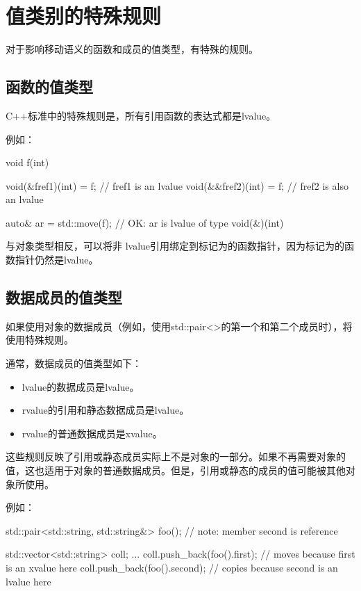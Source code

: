 \section{值类别的特殊规则}
对于影响移动语义的函数和成员的值类型，有特殊的规则。

\subsection{函数的值类型}

C++标准中的特殊规则是，所有引用函数的表达式都是lvalue。

例如：

\begin{cppcode}
void f(int) {
}

void(&fref1)(int) = f; // fref1 is an lvalue
void(&&fref2)(int) = f; // fref2 is also an lvalue

auto& ar = std::move(f); // OK: ar is lvalue of type void(&)(int)
\end{cppcode}

与对象类型相反，可以将非 lvalue引用绑定到标记为的函数指针，因为标记为的函数指针仍然是lvalue。

\subsection{数据成员的值类型}

如果使用对象的数据成员（例如，使用std::pair<>的第一个和第二个成员时），将使用特殊规则。

通常，数据成员的值类型如下：

\begin{itemize}
	\item lvalue的数据成员是lvalue。
	\item rvalue的引用和静态数据成员是lvalue。
	\item rvalue的普通数据成员是xvalue。
\end{itemize}

这些规则反映了引用或静态成员实际上不是对象的一部分。如果不再需要对象的值，这也适用于对象的普通数据成员。但是，引用或静态的成员的值可能被其他对象所使用。

例如：

\begin{cppcode}
std::pair<std::string, std::string&> foo(); // note: member second is reference

std::vector<std::string> coll;
...
coll.push_back(foo().first); // moves because first is an xvalue here
coll.push_back(foo().second); // copies because second is an lvalue here
\end{cppcode}

